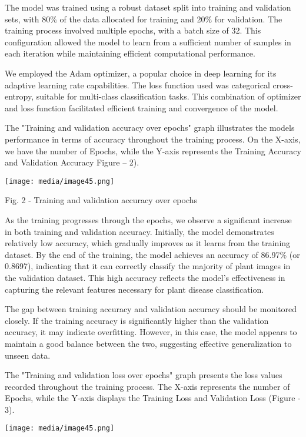 \documentclass[
]{article}
\begin{document}
The model was trained using a robust dataset split into training and
validation sets, with 80\% of the data allocated for training and 20\%
for validation. The training process involved multiple epochs, with a
batch size of 32. This configuration allowed the model to learn from a
sufficient number of samples in each iteration while maintaining
efficient computational performance.

We employed the Adam optimizer, a popular choice in deep learning for
its adaptive learning rate capabilities. The loss function used was
categorical cross-entropy, suitable for multi-class classification
tasks. This combination of optimizer and loss function facilitated
efficient training and convergence of the model.

The "Training and validation accuracy over epochs" graph illustrates the
model\textquotesingle s performance in terms of accuracy throughout the
training process. On the X-axis, we have the number of Epochs, while the
Y-axis represents the Training Accuracy and Validation Accuracy Figure
-- 2).

\texttt{[image: media/image45.png]}

Fig. 2 - Training and validation accuracy over epochs

As the training progresses through the epochs, we observe a significant
increase in both training and validation accuracy. Initially, the model
demonstrates relatively low accuracy, which gradually improves as it
learns from the training dataset. By the end of the training, the model
achieves an accuracy of 86.97\% (or 0.8697), indicating that it can
correctly classify the majority of plant images in the validation
dataset. This high accuracy reflects the model's effectiveness in
capturing the relevant features necessary for plant disease
classification.

The gap between training accuracy and validation accuracy should be
monitored closely. If the training accuracy is significantly higher than
the validation accuracy, it may indicate overfitting. However, in this
case, the model appears to maintain a good balance between the two,
suggesting effective generalization to unseen data.

The "Training and validation loss over epochs" graph presents the loss
values recorded throughout the training process. The X-axis represents
the number of Epochs, while the Y-axis displays the Training Loss and
Validation Loss (Figure - 3).

\texttt{[image: media/image45.png]}
\end{document}
